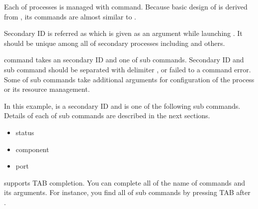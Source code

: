 \documentclass[a4paper,11pt,openany,oneside,english]{sphinxmanual}
\begin{document}
Each of  processes is managed with  command. Because
basic design of  is derived from , its commands are
almost similar to .

Secondary ID is referred as  which is given as an argument
while launching . It should be unique among all of secondary
processes including  and others.

 command takes an secondary ID and one of sub commands. Secondary ID
and sub command should be separated with delimiter \sphinxcode{\sphinxupquote{;}}, or failed to a
command error. Some of sub commands take additional arguments for
configuration of the process or its resource management.

\begin{sphinxVerbatim}[commandchars=\\\{\},formatcom=\footnotesize]
\end{sphinxVerbatim}

In this example,  is a secondary ID and  is one of the
following sub commands. Details of each of sub commands are described in the
next sections.
\begin{itemize}
\item {} 
status

\item {} 
component

\item {} 
port

\end{itemize}

 supports TAB completion. You can complete all of the name
of commands and its arguments. For instance, you find all of sub commands
by pressing TAB after .

\begin{sphinxVerbatim}[commandchars=\\\{\},formatcom=\footnotesize]
\end{sphinxVerbatim}
\end{document}
